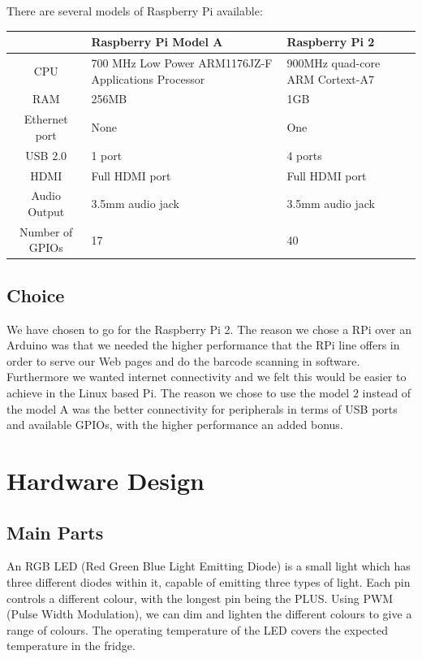 \documentclass[10pt]{article}
\begin{document}
There are several models of Raspberry Pi available:

\begin{center}
	\begin{tabular}{| c | p{6cm} | p{6cm} |}
		\hline
		  & Raspberry Pi Model A & Raspberry Pi 2 \\ \hline
		CPU & 700 MHz Low Power ARM1176JZ-F Applications Processor & 900MHz quad-core ARM Cortext-A7 \\ \hline
		RAM & 256MB & 1GB \\ \hline
		Ethernet port & None & One \\ \hline
		USB 2.0 & 1 port & 4 ports \\ \hline
		HDMI & Full HDMI port & Full HDMI port \\ \hline
		Audio Output & 3.5mm audio jack & 3.5mm audio jack \\ \hline
		Number of GPIOs & 17 & 40 \\ \hline
	\end{tabular}
\end{center}

\subsection{Choice}
We have chosen to go for the Raspberry Pi 2. The reason we chose a RPi over an Arduino was that we needed the higher performance that the RPi line offers in order to serve our Web pages and do the barcode scanning in software. Furthermore we wanted internet connectivity and we felt this would be easier to achieve in the Linux based Pi. The reason we chose to use the model 2 instead of the model A was the better connectivity for peripherals in terms of USB ports and available GPIOs, with the higher performance an added bonus.

\newpage
\section{Hardware Design}
\subsection{Main Parts}

An RGB LED (Red Green Blue Light Emitting Diode) is a small light which has three different diodes within it, capable of emitting three types of light. Each pin controls a different colour, with the longest pin being the PLUS. Using PWM (Pulse Width Modulation), we can dim and lighten the different colours to give a range of colours. The operating temperature of the LED covers the expected temperature in the fridge.
\end{document}
